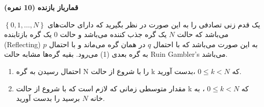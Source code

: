 \Large \textbf{قمارباز بازنده}
\large \textbf{(10 نمره)}

\normalsize \vspace{0.5cm}

یک قدم زنی تصادفی را به این صورت در نظر بگیرید که دارای حالت‌های
$\left\{ {0,1, \ldots ,N} \right\}$
 می‌باشد که حالت $N$ یک گره جذب کننده می‌باشد و حالت $0$ یک گره بازتابنده (Reflecting) به این صورت می‌باشد که با احتمال $q$ در همان گره می‌ماند و با احتمال $p$ به گره بعدی (1) می‌رود.‌ بقیه گره‌ها مشابه حالت Ruin Gambler's می‌باشد.
 
\begin{enumerate}[label=(\alph*)]
	
	\item
	احتمال رسیدن به گره N را با شروع از حالت k که
	$0 \le k < N$
	،بدست آورید.
	\item
	مقدار متوسطی زمانی که لازم است که با شروع از حالت k که
	$0 \le k < N$
	، به خانه $N$ برسید را بدست آورید.
	
\end{enumerate}